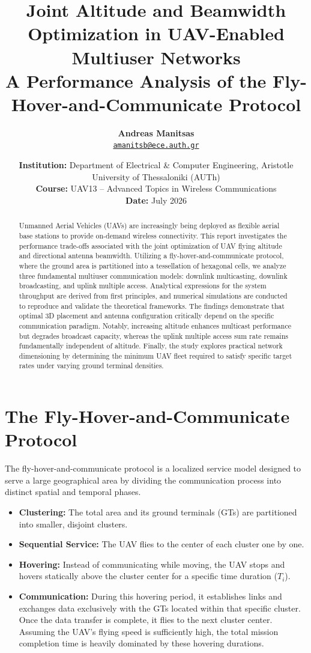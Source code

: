 \documentclass[11pt,a4paper]{article}
\title{
    \vspace{-20pt}
    \fontfamily{phv}\selectfont\Huge\bfseries\color{DeepNavy} Joint Altitude and Beamwidth Optimization in UAV-Enabled Multiuser Networks \\[0.3em]
    \large\bfseries\color{SlateGrey} A Performance Analysis of the Fly-Hover-and-Communicate Protocol
}
\author{
    \textbf{Andreas Manitsas} \\
    \small \href{mailto:amanitsb@ece.auth.gr}{\texttt{amanitsb@ece.auth.gr}}
}
\date{\small \color{SlateGrey}\textbf{Institution:} Department of Electrical \& Computer Engineering, Aristotle University of Thessaloniki (AUTh) \\[0.5em] \textbf{Course:} UAV13 – Advanced Topics in Wireless Communications \\[0.5em] \textbf{Date:} July 2026}
\begin{document}
\maketitle

\begin{abstract}
\noindent
Unmanned Aerial Vehicles (UAVs) are increasingly being deployed as flexible aerial base stations to provide on-demand wireless connectivity.
This report investigates the performance trade-offs associated with the joint optimization of UAV flying altitude and directional antenna beamwidth.
Utilizing a fly-hover-and-communicate protocol, where the ground area is partitioned into a tessellation of hexagonal cells, we analyze three fundamental multiuser communication models:
downlink multicasting, downlink broadcasting, and uplink multiple access. Analytical expressions for the system throughput are derived from first principles,
and numerical simulations are conducted to reproduce and validate the theoretical frameworks. The findings demonstrate that optimal 3D placement and antenna configuration critically depend on the specific communication paradigm.
Notably, increasing altitude enhances multicast performance but degrades broadcast capacity, whereas the uplink multiple access sum rate remains fundamentally independent of altitude.
Finally, the study explores practical network dimensioning by determining the minimum UAV fleet required to satisfy specific target rates under varying ground terminal densities.
\end{abstract}

\newpage
\tableofcontents

\newpage
\section{The Fly-Hover-and-Communicate Protocol}
The fly-hover-and-communicate protocol is a localized service model designed to serve a large geographical area by dividing the communication process into distinct spatial and temporal phases.

\begin{itemize}
    \item \textbf{Clustering:} The total area and its ground terminals (GTs) are partitioned into smaller, disjoint clusters.
    \item \textbf{Sequential Service:} The UAV flies to the center of each cluster one by one.
    \item \textbf{Hovering:} Instead of communicating while moving, the UAV stops and hovers statically above the cluster center for a specific time duration ($T_i$).
    \item \textbf{Communication:} During this hovering period, it establishes links and exchanges data exclusively with the GTs located within that specific cluster.
    Once the data transfer is complete, it flies to the next cluster center. Assuming the UAV's flying speed is sufficiently high,
    the total mission completion time is heavily dominated by these hovering durations.
\end{itemize}
\end{document}
